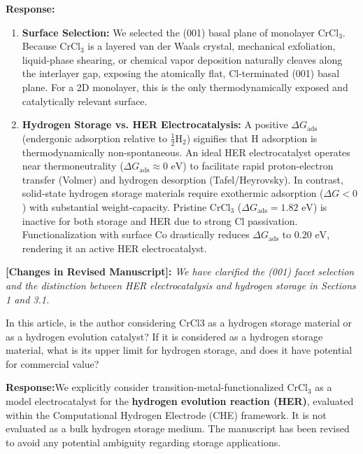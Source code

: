 \documentclass[11pt, sans, a4paper]{moderncv}
\newcommand{\response}{\vspace{0.4em}\noindent\textbf{\color{actionblue}Response:}\hspace{0.5em}}
\newcommand{\manuscriptchange}[1]{\vspace{0.3em}\noindent\textbf{\color{acsblue}[Changes in Revised Manuscript]:} \textit{#1}\vspace{0.4em}}
\begin{document}
\response 
\begin{enumerate}[leftmargin=1.5em, itemsep=0.2em]
    \item \textbf{Surface Selection:} We selected the (001) basal plane of monolayer $\text{CrCl}_3$. Because $\text{CrCl}_3$ is a layered van der Waals crystal, mechanical exfoliation, liquid-phase shearing, or chemical vapor deposition naturally cleaves along the interlayer gap, exposing the atomically flat, Cl-terminated (001) basal plane. For a 2D monolayer, this is the only thermodynamically exposed and catalytically relevant surface.
    \item \textbf{Hydrogen Storage vs. HER Electrocatalysis:} A positive $\Delta G_{\mathrm{ads}}$ (endergonic adsorption relative to $\frac{1}{2}\text{H}_2$) signifies that H adsorption is thermodynamically non-spontaneous. An ideal HER electrocatalyst operates near thermoneutrality ($\Delta G_{\mathrm{ads}} \approx 0\text{ eV}$) to facilitate rapid proton-electron transfer (Volmer) and hydrogen desorption (Tafel/Heyrovsky). In contrast, solid-state hydrogen storage materials require exothermic adsorption ($\Delta G < 0$) with substantial weight-capacity. Pristine $\text{CrCl}_3$ ($\Delta G_{\mathrm{ads}} = 1.82\text{ eV}$) is inactive for both storage and HER due to strong Cl passivation. Functionalization with surface Co drastically reduces $\Delta G_{\mathrm{ads}}$ to $0.20\text{ eV}$, rendering it an active HER electrocatalyst.
\end{enumerate}

\manuscriptchange{We have clarified the (001) facet selection and the distinction between HER electrocatalysis and hydrogen storage in Sections 1 and 3.1.}

\begin{reviewercomment}
In this article, is the author considering CrCl3 as a hydrogen storage material or as a hydrogen evolution catalyst? If it is considered as a hydrogen storage material, what is its upper limit for hydrogen storage, and does it have potential for commercial value?
\end{reviewercomment}

\response We explicitly consider transition-metal-functionalized $\text{CrCl}_3$ as a model electrocatalyst for the \textbf{hydrogen evolution reaction (HER)}, evaluated within the Computational Hydrogen Electrode (CHE) framework. It is not evaluated as a bulk hydrogen storage medium. The manuscript has been revised to avoid any potential ambiguity regarding storage applications.
\end{document}
